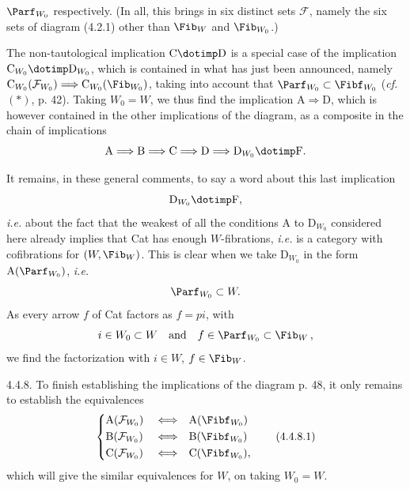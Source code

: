 \setcounter{footnote}{30}

$\Parf_{W_0}$ respectively. (In all, this brings in six distinct sets $\mathcal{F}$, namely the six sets of diagram (4.2.1) other than $\Fib_W$ and $\Fib_{W_0}$.)

The non-tautological implication $\mathrm{C} \dotimp \mathrm{D}$ is a special case of the implication $\mathrm{C}_{W_0} \dotimp \mathrm{D}_{W_0}$, which is contained in what has just been announced, namely $\mathrm{C}_{W_0}(\mathcal{F}_{W_0}) \Longrightarrow \mathrm{C}_{W_0}(\Fib_{W_0})$, taking into account that $\Parf_{W_0} \subset \Fibf_{W_0}$ (\textit{cf.} $(*)$, p. 42). Taking
$W_0 = W$, we thus find the implication $\mathrm{A} \Longrightarrow \mathrm{D}$, which is however contained in the other implications of the diagram, as a composite in the chain of implications
\[
\mathrm{A} \Longrightarrow \mathrm{B} \Longrightarrow \mathrm{C} \Longrightarrow \mathrm{D} \Longrightarrow \mathrm{D}_{W_0} \dotimp \mathrm{F}.
\]

It remains, in these general comments, to say a word about this last implication
\[
\mathrm{D}_{W_0} \dotimp \mathrm{F},
\]
\textit{i.e.} about the fact that the weakest of all the conditions A to $\mathrm{D}_{W_0}$ considered here already implies that Cat has enough $W$-fibrations, \textit{i.e.} is a category with cofibrations for $(W, \Fib_W)$. This is clear when we take $\mathrm{D}_{W_0}$ in the form $\mathrm{A}(\Parf_{W_0})$, \textit{i.e.}
\[
\Parf_{W_0} \subset W.
\]
As every arrow $f$ of Cat factors as $f = pi$, with
\[
i \in W_0 \subset W \quad\text{and}\quad f \in \Parf_{W_0} \subset \Fib_W\, , %
\]
we find the factorization with $i \in W$, $f \in \Fib_W$. %

4.4.8. To finish establishing the implications of the diagram p. 48, it only remains to establish the equivalences
\[
\left\{
\begin{aligned}
&\mathrm{A}(\mathcal{F}_{W_0}) &&\Longleftrightarrow &&\mathrm{A}(\Fibf_{W_0})\\
&\mathrm{B}(\mathcal{F}_{W_0}) &&\Longleftrightarrow &&\mathrm{B}(\Fibf_{W_0})\\
&\mathrm{C}(\mathcal{F}_{W_0}) &&\Longleftrightarrow &&\mathrm{C}(\Fibf_{W_0}),
\end{aligned}
\right.
\tag*{(4.4.8.1)}
\]
which will give the similar equivalences for $W$, on taking $W_0 = W$.

